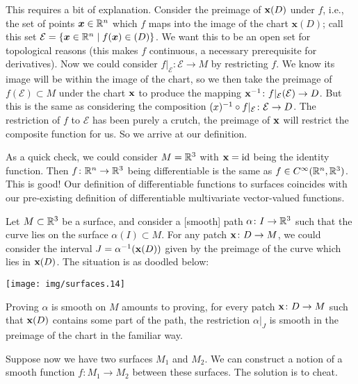 \begin{remark}
This requires a bit of explanation. Consider the preimage of
$\mathbf{x}(D)$ under $f$, i.e., the set of points $\boldsymbol{x}\in\mathbb{R}^{n}$
which $f$ maps into the image of the chart $\mathbf{x}(D)$; call this
set $\mathcal{E} = \{\boldsymbol{x}\in\mathbb{R}^{n}\mid f(\boldsymbol{x})\in\mathbf{(}D)\}$.
We want this to be an open set for topological reasons (this makes $f$
continuous, a necessary prerequisite for derivatives). Now we could
consider $f|_{\mathcal{E}}\colon\mathcal{E}\to M$ by restricting $f$.
We know its image will be within the image of the chart, so we
then take the preimage of $f(\mathcal{E})\subset M$ under the chart
$\mathbf{x}$ to produce the mapping
$\mathbf{x}^{-1}\colon f|_{\mathcal{E}}(\mathcal{E})\to D$.
But this is the same as considering the composition
$\mathbf{(}x)^{-1}\circ f|_{\mathcal{E}}\colon\mathcal{E}\to D$.
The restriction of $f$ to $\mathcal{E}$ has been purely a crutch, the
preimage of $\mathbf{x}$ will restrict the composite function for us. So
we arrive at our definition.
\end{remark}

\begin{remark}
As a quick check, we could consider $M=\mathbb{R}^{3}$ with $\mathbf{x}=\mathrm{id}$
being the identity function. Then $f\colon\mathbb{R}^{n}\to\mathbb{R}^{3}$ being
differentiable is the same as $f\in C^{\infty}(\mathbb{R}^{n},\mathbb{R}^{3})$. This
is good! Our definition of differentiable functions to surfaces
coincides with our pre-existing definition of differentiable
multivariate vector-valued functions.
\end{remark}

\begin{example}
Let $M\subset\mathbb{R}^{3}$ be a surface, and consider a [smooth] path
$\alpha\colon I\to\mathbb{R}^{3}$
such that the curve lies on the surface $\alpha(I)\subset M$.
For any patch $\mathbf{x}\colon D\to M$, we could consider 
the interval $J=\alpha^{-1}(\mathbf{x}(D))$ given by the preimage of the
curve which lies in $\mathbf{x}(D)$. The situation is as doodled below:
\begin{center}
  \texttt{[image: img/surfaces.14]}
\end{center}
Proving $\alpha$ is smooth on $M$ amounts to proving, for every patch
$\mathbf{x}\colon D\to M$ such that $\mathbf{x}(D)$ contains some part of
the path, the restriction $\alpha|_{J}$ is smooth in the preimage of the
chart in the familiar way. 
\end{example}

\label{defn:smooth-functions-between-surfaces}
Suppose now we have two surfaces $M_{1}$ and $M_{2}$. We can construct a
notion of a smooth function $f\colon M_{1}\to M_{2}$ between these
surfaces. The solution is to cheat.

